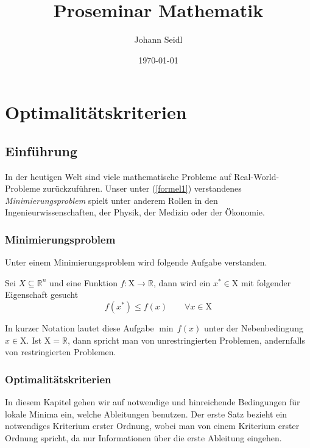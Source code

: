 \documentclass[a4paper,10pt]{scrartcl}
\title{Proseminar Mathematik}
\author{Johann Seidl}
\date{\today}
\begin{document}
\maketitle
\tableofcontents
\newpage


\chapter{Optimalitätskriterien}


\section{Einführung}
In der heutigen Welt sind viele mathematische Probleme auf Real-World-Probleme zurückzuführen. Unser unter (\ref{formel1}) verstandenes \textit{Minimierungsproblem} spielt unter anderem Rollen in den Ingenieurwissenschaften, der Physik, der Medizin oder der Ökonomie. 

\subsection{Minimierungsproblem}
Unter einem Minimierungsproblem wird folgende Aufgabe verstanden. \\ 

\begin{definition}
	Sei $ X \subseteq \mathbb{R}^n $ und eine Funktion $ f:\mathrm{X} \longrightarrow \mathbb{R} $, dann wird ein $x^* \in \mathrm{X} $ mit folgender Eigenschaft gesucht
	\begin{equation} 
	f(x^*) \leq f(x)   \qquad \forall x \in \mathrm{X} 
	\label{formel1}
	\end{equation}
\end{definition}

\begin{bemerkung}
	In kurzer Notation lautet diese Aufgabe $ \min \, f(x)$ unter der Nebenbedingung $x \in \mathrm{X} $. Ist $\mathrm{X} = \mathbb{R}$, dann spricht man von unrestringierten Problemen, andernfalls von restringierten Problemen. 
\end{bemerkung}

\subsection{Optimalitätskriterien}

In diesem Kapitel gehen wir auf notwendige und hinreichende Bedingungen für lokale Minima ein, welche Ableitungen benutzen. Der erste Satz bezieht ein notwendiges Kriterium erster Ordnung, wobei man von einem Kriterium erster Ordnung spricht, da nur Informationen über die erste Ableitung eingehen.
\end{document}
